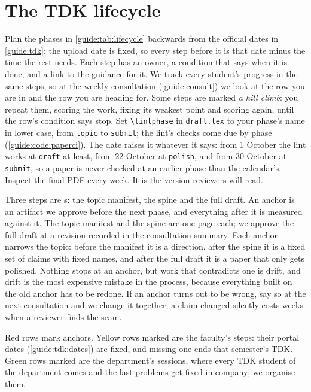 \chapter{The TDK lifecycle}\label{guide:lifecycle}
Plan the phases in \cref{guide:tab:lifecycle} backwards from the official dates in \cref{guide:tdk}: the upload date is fixed, so every step before it is that date minus the time the rest needs. Each step has an owner, a condition that says when it is done, and a link to the guidance for it.
We track every student's progress in the same steps, so at the weekly consultation (\cref{guide:consult}) we look at the row you are in and the row you are heading for. Some steps are marked \emph{a hill climb}: you repeat them, scoring the work, fixing its weakest point and scoring again, until the row's condition says stop.
Set \texttt{\textbackslash lintphase} in \texttt{draft.tex} to your phase's name in lower case, from \texttt{topic} to \texttt{submit}; the lint's checks come due by phase (\cref{guide:code:paperci}). The date raises it whatever it says: from 1 October the lint works at \texttt{draft} at least, from 22 October at \texttt{polish}, and from 30 October at \texttt{submit}, so a paper is never checked at an earlier phase than the calendar's.
Inspect the final PDF every week. It is the version reviewers will read.

Three steps are \anchor{}s: the topic manifest, the spine and the full draft. An anchor is an artifact we approve before the next phase, and everything after it is measured against it. The topic manifest and the spine are one page each; we approve the full draft at a revision recorded in the consultation summary. Each anchor narrows the topic: before the manifest it is a direction, after the spine it is a fixed set of claims with fixed names, and after the full draft it is a paper that only gets polished. Nothing stops at an anchor, but work that contradicts one is drift, and drift is the most expensive mistake in the process, because everything built on the old anchor has to be redone. If an anchor turns out to be wrong, say so at the next consultation and we change it together; a claim changed silently costs weeks when a reviewer finds the seam.

Red rows mark anchors. Yellow rows marked \official{} are the faculty's steps: their portal dates (\cref{guide:tdk:dates}) are fixed, and missing one ends that semester's TDK. Green rows marked \department{} are the department's sessions, where every TDK student of the department comes and the last problems get fixed in company; we organise them.

